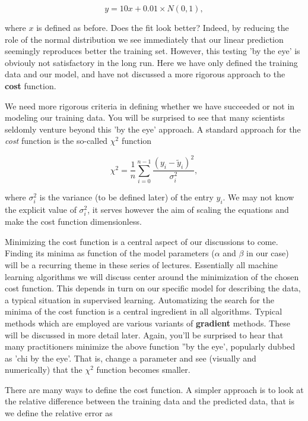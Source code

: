 \documentclass[%
oneside,                 %
final,                   %
10pt]{article}
\begin{document}
\[
y = 10x+0.01 \times N(0,1),
\]

where $x$ is defined as before.  Does the fit look better? Indeed, by
reducing the role of the normal distribution we see immediately that
our linear prediction seemingly reproduces better the training
set. However, this testing 'by the eye' is obviouly not satisfactory in the
long run. Here we have only defined the training data and our model, and 
have not discussed a more rigorous approach to the \textbf{cost} function.

We need more rigorous criteria in defining whether we have succeeded or
not in modeling our training data.  You will be surprised to see that
many scientists seldomly venture beyond this 'by the eye' approach. A
standard approach for the \emph{cost} function is the so-called $\chi^2$
function 

\[ \chi^2 = \frac{1}{n}
\sum_{i=0}^{n-1}\frac{(y_i-\tilde{y}_i)^2}{\sigma_i^2}, 
\] 

where $\sigma_i^2$ is the variance (to be defined later) of the entry
$y_i$.  We may not know the explicit value of $\sigma_i^2$, it serves
however the aim of scaling the equations and make the cost function
dimensionless.  

Minimizing the cost function is a central aspect of
our discussions to come. Finding its minima as function of the model
parameters ($\alpha$ and $\beta$ in our case) will be a recurring
theme in these series of lectures. Essentially all machine learning
algorithms we will discuss center around the minimization of the
chosen cost function. This depends in turn on our specific
model for describing the data, a typical situation in supervised
learning. Automatizing the search for the minima of the cost function is a
central ingredient in all algorithms. Typical methods which are
employed are various variants of \textbf{gradient} methods. These will be
discussed in more detail later. Again, you'll be surprised to hear that
many practitioners minimize the above function ''by the eye', popularly dubbed as 
'chi by the eye'. That is, change a parameter and see (visually and numerically) that 
the  $\chi^2$ function becomes smaller. 

There are many ways to define the cost function. A simpler approach is to look at the relative difference between the training data and the predicted data, that is we define 
the relative error as
\end{document}
